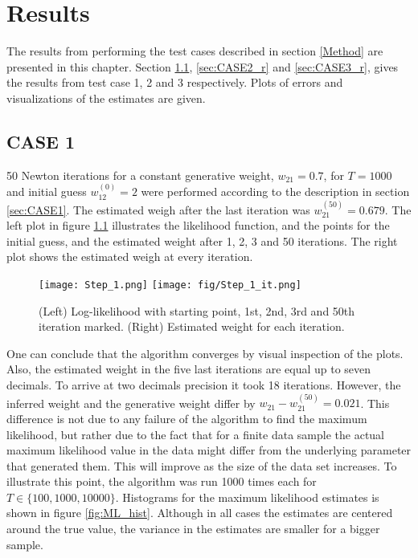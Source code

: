 
\chapter{Results}
\label{ch:results}

The results from performing the test cases described in section \ref{Method} are presented in this chapter. Section \ref{sec:CASE1_r}, \ref{sec:CASE2_r} and \ref{sec:CASE3_r}, gives the results from test case 1, 2 and 3 respectively. Plots of errors and visualizations of the estimates are given. 

\section{CASE 1}
\label{sec:CASE1_r}
50 Newton iterations for a constant generative weight, $w_{21} = 0.7$, for $T=1000$ and initial guess $w_{12}^{(0)} = 2$ were performed according to the description in section \ref{sec:CASE1}. The estimated weigh after the last iteration was $w_{21}^{(50)}=0.679$. The left plot in figure \ref{fig:Newton} illustrates the likelihood function, and the points for the initial guess, and the estimated weight after 1, 2, 3 and 50 iterations. The right plot shows the estimated weigh at every iteration.



\begin{figure}[hbt!]
\caption{(Left) Log-likelihood with starting point, 1st, 2nd, 3rd and 50th iteration marked. (Right) Estimated weight for each iteration.}
\label{fig:Newton}
    \centering
    \texttt{[image: Step\_1.png]}
    \texttt{[image: fig/Step\_1\_it.png]}
\end{figure}

One can conclude that the algorithm converges by visual inspection of the plots. Also, the estimated weight in the five last iterations are equal up to seven decimals. To arrive at two decimals precision it took 18 iterations. However, the inferred weight and the generative weight differ by $w_{21} - w_{21}^{(50)} = 0.021$. This difference is not due to any failure of the algorithm to find the maximum likelihood, but rather due to the fact that for a finite data sample the actual maximum likelihood value in the data might differ from the underlying parameter that generated them. This will improve as the size of the data set increases. To illustrate this point, the algorithm was run 1000 times each for $T \in \{ 100,1000,10000\}$. Histograms for the maximum likelihood estimates is shown in figure \ref{fig:ML_hist}. Although in all cases the estimates are centered around the true value,  the variance in the estimates are smaller for a bigger sample. 

